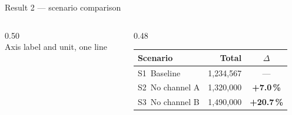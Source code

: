 \documentclass[aspectratio=169,11pt]{beamer}   %
\begin{document}
\begin{frame}{Result 2 --- scenario comparison}
\begin{columns}[T]
\begin{column}{0.50\textwidth}
\centering
\\[1mm]
{\color{muted}\scriptsize Axis label and unit, one line}
\end{column}
\begin{column}{0.48\textwidth}
\footnotesize
\setlength{\tabcolsep}{4pt}\renewcommand{\arraystretch}{1.25}
\begin{tabular}{@{}p{34mm}r c@{}}
\toprule
\textbf{Scenario} & \textbf{Total} & \textbf{$\Delta$} \\
\midrule
S1\ Baseline     & 1{,}234{,}567 & --- \\
S2\ No channel A & 1{,}320{,}000 & {\color{accent}\bfseries +7.0\,\%} \\
S3\ No channel B & 1{,}490{,}000 & {\color{accent}\bfseries +20.7\,\%} \\
\bottomrule
\end{tabular}\\[2.5mm]
\end{column}
\end{columns}
\end{frame}
\end{document}
